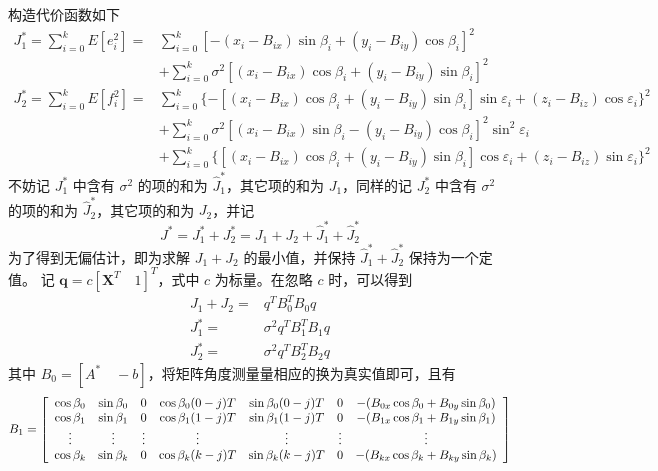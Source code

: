 构造代价函数如下
\begin{equation}
	\begin{split}
		J_1^* = \sum_{i=0}^{k}E[e_i^2] =& \sum_{i=0}^{k}[-(x_i -B_{ix})\sin\beta_i + (y_i -B_{iy})\cos\beta_i]^2 \\
		&+ \sum_{i=0}^{k}\sigma^2[(x_i -B_{ix})\cos\beta_i + (y_i -B_{iy})\sin\beta_i]^2 \\
		J_2^* = \sum_{i=0}^{k}E[f_i^2] = &\sum_{i=0}^{k}\lbrace-[(x_i -B_{ix})\cos\beta_i + (y_i -B_{iy})\sin\beta_i]\sin\varepsilon_i + (z_i-B_{iz})\cos\varepsilon_i \rbrace ^2 \\
		& + \sum_{i=0}^{k}\sigma^2 [(x_i -B_{ix})\sin\beta_i - (y_i -B_{iy})\cos\beta_i]^2 \sin^2 \varepsilon_i \\
		&+ \sum_{i=0}^{k}\lbrace [(x_i -B_{ix})\cos\beta_i + (y_i -B_{iy})\sin\beta_i]\cos\varepsilon_i + (z_i -B_{iz})\sin\varepsilon_i \rbrace ^2 
	\end{split}
\end{equation}
不妨记 $J_1^*$ 中含有 $\sigma^2$ 的项的和为 $\hat{J}_1^*$，其它项的和为 $J_1$，同样的记 $J_2^*$ 中含有 $\sigma^2$ 的项的和为 $\hat{J}_2^*$，其它项的和为 $J_2$，并记
\begin{equation}
	J^* = J_1^* + J_2^* = J_1 + J_2 + \hat{J}_1^* + \hat{J}_2^*
\end{equation}
为了得到无偏估计，即为求解 $J_1 +J_2$ 的最小值，并保持 $\hat{J}_1^* + \hat{J}_2^*$ 保持为一个定值。
记 $\bm{q} = c[\bm{X}^T \quad 1]^T$，式中 $c$ 为标量。在忽略 $c$ 时，可以得到
\begin{equation}
	\begin{split}
		J_1 + J_2 =& q^T B_0^T B_0 q \\
		J_1^* =& \sigma^2 q^T B_1^T B_1 q\\
		J_2^* =& \sigma^2 q^T B_2^T B_2 q
	\end{split}	
\end{equation}
其中 $B_0 = [A^* \quad -b]$，将矩阵角度测量量相应的换为真实值即可，且有
\begin{equation}
	\vspace{-10pt}
	B_1 = \left[\begin{array}{ccccccc}
		\cos\beta_0 & \sin\beta_0 & 0 & \cos\beta_0(0-j)T & \sin\beta_0 (0-j)T & 0 & -(B_{0x}\cos\beta_0+B_{0y}\sin\beta_0) \\
		\cos\beta_1 & \sin\beta_1 & 0 & \cos\beta_1(1-j)T & \sin\beta_1 (1-j)T & 0 & -(B_{1x}\cos\beta_1+B_{1y}\sin\beta_1) \\
		\vdots & \vdots & \vdots & \vdots & \vdots & \vdots & \vdots \\
		\cos\beta_k & \sin\beta_k & 0 & \cos\beta_k(k-j)T & \sin\beta_k (k-j)T & 0 & -(B_{kx}\cos\beta_k+B_{ky}\sin\beta_k)
	\end{array}\right] 
\end{equation}

